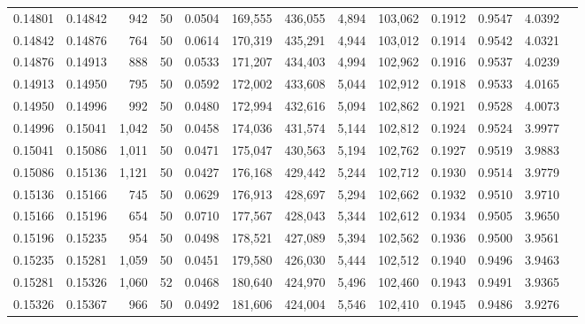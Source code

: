 \begin{tabular}{rrrrrrrrrrrrr}
0.14801 & 0.14842 &   942 &  50 &                                     0.0504 & 169,555 & 436,055 &   4,894 & 103,062 & 0.1912 & 0.9547 & 4.0392 \\
0.14842 & 0.14876 &   764 &  50 &                                     0.0614 & 170,319 & 435,291 &   4,944 & 103,012 & 0.1914 & 0.9542 & 4.0321 \\
0.14876 & 0.14913 &   888 &  50 &                                     0.0533 & 171,207 & 434,403 &   4,994 & 102,962 & 0.1916 & 0.9537 & 4.0239 \\
0.14913 & 0.14950 &   795 &  50 &                                     0.0592 & 172,002 & 433,608 &   5,044 & 102,912 & 0.1918 & 0.9533 & 4.0165 \\
0.14950 & 0.14996 &   992 &  50 &                                     0.0480 & 172,994 & 432,616 &   5,094 & 102,862 & 0.1921 & 0.9528 & 4.0073 \\
0.14996 & 0.15041 & 1,042 &  50 &                                     0.0458 & 174,036 & 431,574 &   5,144 & 102,812 & 0.1924 & 0.9524 & 3.9977 \\
0.15041 & 0.15086 & 1,011 &  50 &                                     0.0471 & 175,047 & 430,563 &   5,194 & 102,762 & 0.1927 & 0.9519 & 3.9883 \\
0.15086 & 0.15136 & 1,121 &  50 &                                     0.0427 & 176,168 & 429,442 &   5,244 & 102,712 & 0.1930 & 0.9514 & 3.9779 \\
0.15136 & 0.15166 &   745 &  50 &                                     0.0629 & 176,913 & 428,697 &   5,294 & 102,662 & 0.1932 & 0.9510 & 3.9710 \\
0.15166 & 0.15196 &   654 &  50 &                                     0.0710 & 177,567 & 428,043 &   5,344 & 102,612 & 0.1934 & 0.9505 & 3.9650 \\
0.15196 & 0.15235 &   954 &  50 &                                     0.0498 & 178,521 & 427,089 &   5,394 & 102,562 & 0.1936 & 0.9500 & 3.9561 \\
0.15235 & 0.15281 & 1,059 &  50 &                                     0.0451 & 179,580 & 426,030 &   5,444 & 102,512 & 0.1940 & 0.9496 & 3.9463 \\
0.15281 & 0.15326 & 1,060 &  52 &                                     0.0468 & 180,640 & 424,970 &   5,496 & 102,460 & 0.1943 & 0.9491 & 3.9365 \\
0.15326 & 0.15367 &   966 &  50 &                                     0.0492 & 181,606 & 424,004 &   5,546 & 102,410 & 0.1945 & 0.9486 & 3.9276 \\

\end{tabular}
